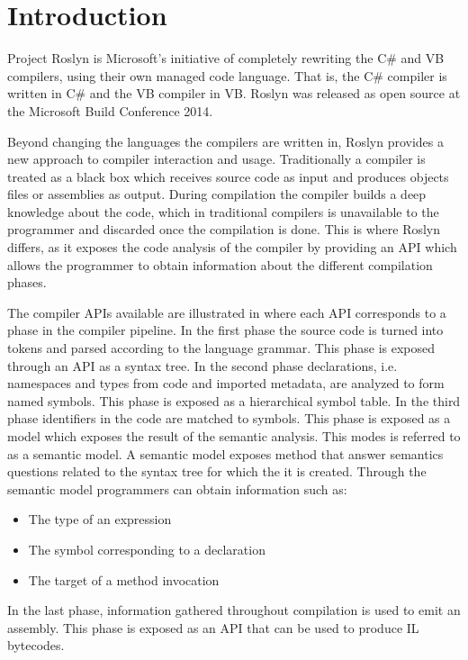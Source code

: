 \section{Introduction}\label{sec:intro}
Project Roslyn is Microsoft's initiative of completely rewriting the C\# and \ac{VB} compilers, using their own managed code language. That is, the C\# compiler is written in C\# and the \ac{VB} compiler in \ac{VB}. Roslyn was released as open source at the Microsoft Build Conference 2014\cite{csharpBuild}.

Beyond changing the languages the compilers are written in, Roslyn provides a new approach to compiler interaction and usage. Traditionally a compiler is treated as a black box which receives source code as input and produces objects files or assemblies as output\cite[p. 3]{ng2012roslyn}. During compilation the compiler builds a deep knowledge about the code, which in traditional compilers is unavailable to the programmer and discarded once the compilation is done. This is where Roslyn differs, as it exposes the code analysis of the compiler by providing an \ac{API} which allows the programmer to obtain information about the different compilation phases\cite[p. 3]{ng2012roslyn}. 

The compiler \acp{API} available are illustrated in  where each \ac{API} corresponds to a phase in the compiler pipeline. In the first phase the source code is turned into tokens and parsed according to the language grammar. This phase is exposed through an \ac{API} as a syntax tree. In the second phase declarations, i.e. namespaces and types from code and imported metadata, are analyzed to form named symbols. This phase is exposed as a hierarchical symbol table. In the third phase identifiers in the code are matched to symbols. This phase is exposed as a model which exposes the result of the semantic analysis. This modes is referred to as a semantic model. A semantic model exposes method that answer semantics questions related to the syntax tree for which the it is created\cite{ng2012roslyn}. Through the semantic model programmers can obtain information such as:
\begin{itemize}
\item The type of an expression
\item The symbol corresponding to a declaration
\item The target of a method invocation
\end{itemize} 
In the last phase, information gathered throughout compilation is used to emit an assembly. This phase is exposed as an \ac{API} that can be used to produce IL bytecodes\cite[p. 3-4]{ng2012roslyn}.

